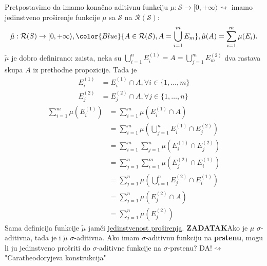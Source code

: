 \documentclass{article}
\begin{document}
Pretpostavimo da imamo konačno aditivnu funkciju \(\mu:\mathcal S\to[0,+\infty\rangle\rightsquigarrow\) imamo jedinstveno proširenje funkcije \(\mu\) sa \(\mathcal S\) na \(\mathcal R(\mathcal S)\): \[\tilde\mu:\mathcal R(S)\to[0,+\infty\rangle, {\color{Blue}{A\in\mathcal R(\mathcal S),A=\bigcup_{i=1}^m E_m}},\tilde\mu(A)=\sum_{i=1}^m\mu(E_i).\] \(\tilde\mu\) je dobro definirano: zaista, neka su \(\bigcup_{i=1}^nE_i^{(1)}=A=\bigcup_{j=1}^mE_m^{(2)}\) dva rastava skupa \(A\) iz prethodne propozicije. Tada je \[\begin{aligned}E_i^{(1)}&=E_i^{(1)}\cap A,\forall i\in\{1,\ldots,m\}\\E_j^{(2)}&=E_j^{(2)}\cap A,\forall j\in\{1,\ldots,n\}\end{aligned}\] \[\begin{aligned}\sum_{i=1}^m\mu\left(E_i^{(1)}\right)&=\sum_{i=1}^m\mu\left(E_i^{(1)}\cap A\right)\\&=\sum_{i=1}^m\mu\left(\bigcup_{j=1}^nE_i^{(1)}\cap E_j^{(2)}\right)\\&=\sum_{i=1}^m\sum_{j=1}^n\mu\left(E_i^{(1)}\cap E_j^{(2)}\right)\\&=\sum_{j=1}^n\sum_{i=1}^m\mu\left(E_j^{(2)}\cap E_i^{(1)}\right)\\&=\sum_{j=1}^n\mu\left(\bigcup_{i=1}^nE_j^{(2)}\cap E_i^{(1)}\right)\\&=\sum_{j=1}^n\mu\left(E_j^{(2)}\cap A\right)\\&=\sum_{j=1}^n\mu\left(E_j^{(2)}\right)\end{aligned}\] Sama definicija funkcije \(\tilde\mu\) jamči \underline{jedinstvenost proširenja}.\newline\newline
\textbf{ZADATAK}\newline Ako je \(\mu\) \(\sigma\)-aditivna, tada je i \(\tilde\mu\) \(\sigma\)-aditivna.\newline\newline
Ako imam \(\sigma\)-aditivnu funkciju na \textbf{prstenu}, mogu li ju jedinstveno prošriti do \(\sigma\)-aditivne funkcije na \(\sigma\)-prstenu? DA!\(\rightsquigarrow\) "Caratheodoryjeva konstrukcija"
\newpage
\end{document}
